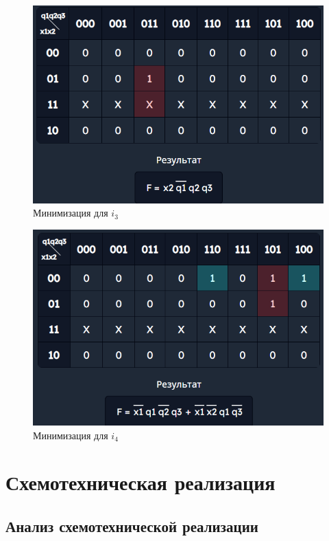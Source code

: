 \documentclass[11pt,a4paper,final]{article} %
\begin{document}
\newpage
\begin{figure}[H]
	\centering
	\includegraphics[width=0.9 \linewidth]{img/i3.png}
	\caption{Минимизация для $i_3$}
	\label{fig:i3}
\end{figure}

\begin{figure}[H]
	\centering
	\includegraphics[width=0.9 \linewidth]{img/i4.png}
	\caption{Минимизация для $i_4$}
	\label{fig:i4}
\end{figure}

\newpage

\section{Схемотехническая реализация}

\subsection{Анализ схемотехнической реализации}
\end{document}
